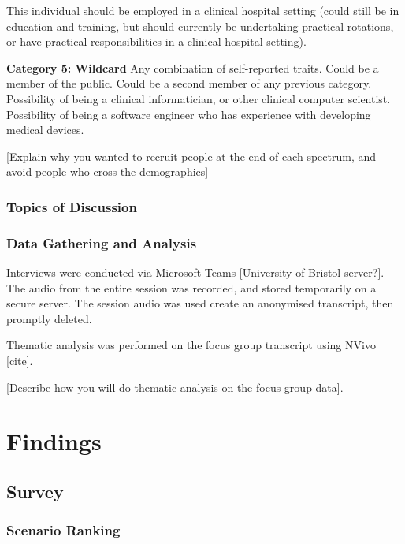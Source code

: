 \documentclass[manuscript,screen,review]{acmart}
\begin{document}
This individual should be employed in a clinical hospital setting (could still be in education and training, but should currently be undertaking practical rotations, or have practical responsibilities in a clinical hospital setting). 


\textbf{Category 5: Wildcard}
Any combination of self-reported traits.
Could be a member of the public.
Could be a second member of any previous category. 
Possibility of being a clinical informatician, or other clinical computer scientist.
Possibility of being a software engineer who has experience with developing medical devices. 

[Explain why you wanted to recruit people at the end of each spectrum, and avoid people who cross the demographics]

\subsubsection{Topics of Discussion}



\subsubsection{Data Gathering and Analysis}
Interviews were conducted via Microsoft Teams [University of Bristol server?]. The audio from the entire session was recorded, and stored temporarily on a secure server. The session audio was used create an anonymised transcript, then promptly deleted. 

Thematic analysis was performed on the focus group transcript using NVivo [cite]. 

[Describe how you will do thematic analysis on the focus group data].









\section{Findings}
\subsection{Survey}
\subsubsection{Scenario Ranking}
\end{document}

